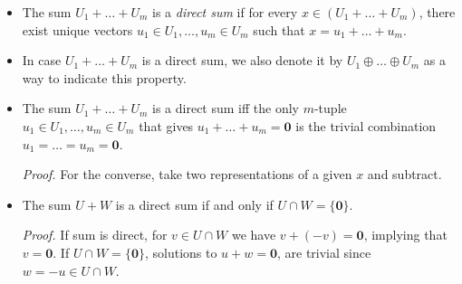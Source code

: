 \documentclass[11pt]{article}
\newcommand{\1}{\mathbf{1}}
\newcommand{\0}{\mathbf{0}}
\newcommand{\B}{\mathcal{B}}
\DeclareMathOperator{\mydeg}{\mathsf{deg}}
\DeclareMathOperator{\myspan}{\mathsf{span}}
\newcommand{\spitem}{\item[$\circ$]}
\begin{document}
\begin{itemize}

%
%

%
%

%
%

\item

The sum $U_1+\dots+U_m$ is a \emph{direct sum} if for every $x \in (U_1+\dots+U_m)$, there exist unique vectors $u_1 \in U_1, \dots, u_m \in U_m$ such that $x=u_1 + \dots + u_m$.

\item
In case $U_1+\dots+U_m$ is a direct sum, we also denote it by $U_1 \oplus \dots \oplus U_m$ as a way to indicate this property.

\item

The sum $U_1+\dots+U_m$ is a direct sum iff the only $m$-tuple $u_1 \in U_1,\dots,u_m\in U_m$ that gives $u_1 + \dots + u_m = \0$ is the trivial combination $u_1=\dots=u_m=\0$.

\emph{Proof.}
For the converse, take two representations of a given $x$ and subtract.

\item

The sum $U + W$ is a direct sum if and only if $U \cap W = \{\0\}$.

\emph{Proof.}
If sum is direct, for $v \in U \cap W$ we have $v + (-v) = \0$, implying that $v=\0$.
If $U \cap W = \{\0\}$, solutions to $u+w = \0$, are trivial since $w = -u \in U \cap W$.

%
%


\end{itemize}
\end{document}
